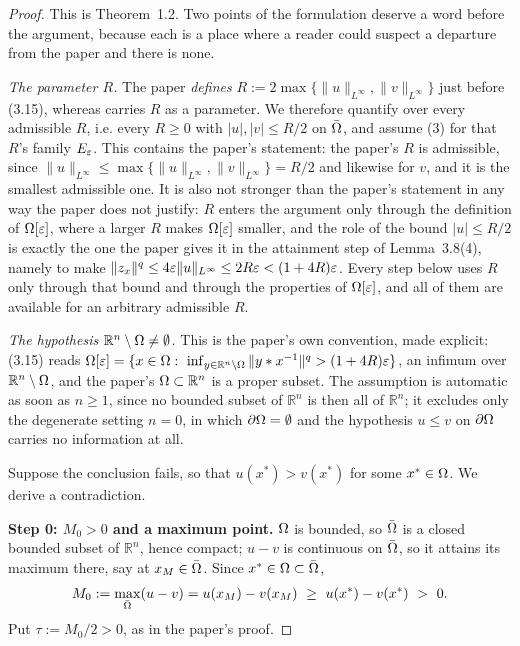 \begin{proof}
This is Theorem~1.2. Two points of the formulation deserve a word before the argument, because
each is a place where a reader could suspect a departure from the paper and there is none.

\emph{The parameter $R$.} The paper \emph{defines} $R:=2\max\{\|u\|_{L^\infty},\|v\|_{L^\infty}\}$
just before (3.15), whereas  carries $R$ as a parameter. We
therefore quantify over every admissible $R$, i.e. every $R\ge0$ with $|u|,|v|\le R/2$ on
$\bar{\Omega}$, and assume (3) for that $R$'s family $E_\varepsilon$. This contains the paper's
statement: the paper's $R$ is admissible, since
$\|u\|_{L^\infty}\le\max\{\|u\|_{L^\infty},\|v\|_{L^\infty}\}=R/2$ and likewise for $v$, and
it is the smallest admissible one. It is also not stronger than the paper's statement in any
way the paper does not justify: $R$ enters the argument only through the definition of
$\Omega[\varepsilon]$, where a larger $R$ makes $\Omega[\varepsilon]$ smaller, and the role of the bound
$|u|\le R/2$ is exactly the one the paper gives it in the attainment step of Lemma~3.8(4),
namely to make $\|z_x\|^{q}\le4\varepsilon\|u\|_{L^\infty}\le2R\varepsilon<(1+4R)\varepsilon$. Every step below
uses $R$ only through that bound and through the properties of $\Omega[\varepsilon]$, and all of them
are available for an arbitrary admissible $R$.

\emph{The hypothesis $\mathbb R^{n}\setminus\Omega\ne\emptyset$.} This is the paper's own
convention, made explicit: (3.15) reads
$\Omega[\varepsilon]=\{x\in\Omega:\ \inf_{y\in\mathbb R^{n}\setminus\Omega}\|y*x^{-1}\|^{q}>(1+4R)\varepsilon\}$, an
infimum over $\mathbb R^{n}\setminus\Omega$, and the paper's $\Omega\subset\mathbb R^{n}$ is a proper
subset. The assumption is automatic as soon as $n\ge1$, since no bounded subset of
$\mathbb R^{n}$ is then all of $\mathbb R^{n}$; it excludes only the degenerate setting
$n=0$, in which $\partial\Omega=\emptyset$ and the hypothesis $u\le v$ on $\partial\Omega$ carries no
information at all.

\medskip
Suppose the conclusion fails, so that $u(x^{*})>v(x^{*})$ for some $x^{*}\in\Omega$. We derive
a contradiction.

\medskip\noindent\textbf{Step 0: $M_0>0$ and a maximum point.} $\Omega$ is bounded, so
$\bar{\Omega}$ is a closed bounded subset of $\mathbb R^{n}$, hence compact; $u-v$ is continuous
on $\bar{\Omega}$, so it attains its maximum there, say at $x_M\in\bar{\Omega}$. Since
$x^{*}\in\Omega\subset\bar{\Omega}$,
\[
 M_0:=\max_{\bar\Om}(u-v)=u(x_M)-v(x_M)\ \ge\ u(x^{*})-v(x^{*})\ >\ 0 .
\]
Put $\tau:=M_0/2>0$, as in the paper's proof.


\end{proof}

